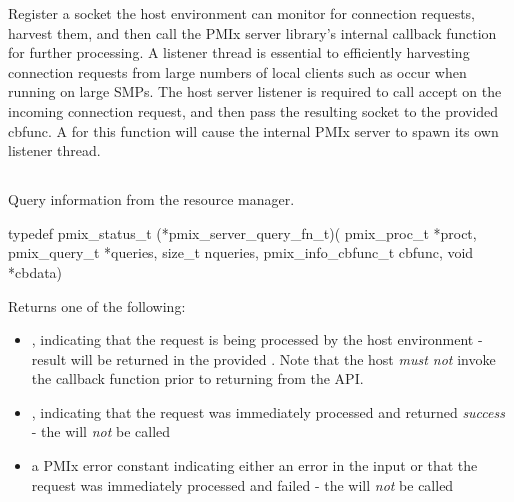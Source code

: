 Register a socket the host environment can monitor for connection requests, harvest them, and then call the \ac{PMIx} server library's internal callback function for further processing.
A listener thread is essential to efficiently harvesting connection requests from large numbers of local clients such as occur when running on large SMPs.
The host server listener is required to call accept on the incoming connection request, and then pass the resulting socket to the provided cbfunc.
A  for this function will cause the internal \ac{PMIx} server to spawn its own listener thread.


\subsection{}

\summary

Query information from the resource manager.

\format

\cspecificstart
\begin{codepar}
typedef pmix_status_t (*pmix_server_query_fn_t)(
                             pmix_proc_t *proct,
                             pmix_query_t *queries, size_t nqueries,
                             pmix_info_cbfunc_t cbfunc,
                             void *cbdata)
\end{codepar}
\cspecificend

\begin{arglist}
\end{arglist}

Returns one of the following:

\begin{itemize}
    \item {}, indicating that the request is being processed by the host environment - result will be returned in the provided . Note that the host \emph{must not} invoke the callback function prior to returning from the \ac{API}.
    \item {}, indicating that the request was immediately processed and returned \textit{success} - the  will \textit{not} be called
    \item a PMIx error constant indicating either an error in the input or that the request was immediately processed and failed - the  will \textit{not} be called
\end{itemize}

